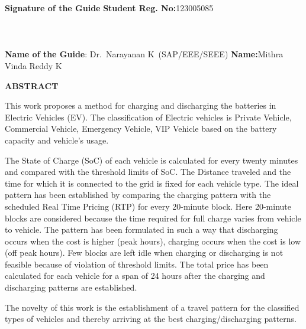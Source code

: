 \documentclass[a4paper, 12pt, oneside]{sastra}
\begin{document}
	\noindent \textbf{Signature of the Guide} \hspace*{66mm} \textbf{Student Reg. No:}123005085\\
		\\
	\\
	\\
	\noindent \textbf{Name of the Guide}:{ Dr.~Narayanan K}~(SAP/EEE/SEEE) \hspace*{7mm} \textbf{Name:}{Mithra Vinda Reddy K}
	\pagebreak
	
	\begin{center}
		\Large{{\textbf{ABSTRACT}}}
	\end{center}
	
	
	\vspace*{24pt}
	
	\noindent This work proposes a method for charging and discharging the batteries in Electric Vehicles (EV). The classification of Electric vehicles is Private Vehicle, Commercial Vehicle, Emergency Vehicle, VIP Vehicle based on the battery capacity and vehicle's usage.
	
	The State of Charge (SoC) of each vehicle is calculated for every twenty minutes and compared with the threshold limits of SoC. The Distance traveled and the time for which it is connected to the grid is fixed for each vehicle type. The ideal pattern has been established by comparing the charging pattern with the scheduled Real Time Pricing (RTP) for every 20-minute block. Here 20-minute blocks are considered because the time required for full charge varies from vehicle to vehicle. The pattern has been formulated in such a way that discharging occurs when the cost is higher (peak hours), charging occurs when the cost is low (off peak hours). Few blocks are left idle when charging or discharging is not feasible because of violation of threshold limits. The total price has been calculated for each vehicle for a span of 24 hours after the charging and discharging patterns are established.
	
	The novelty of this work is the establishment of a travel pattern for the classified types of vehicles and thereby arriving at the best charging/discharging patterns.
	
\end{document}
